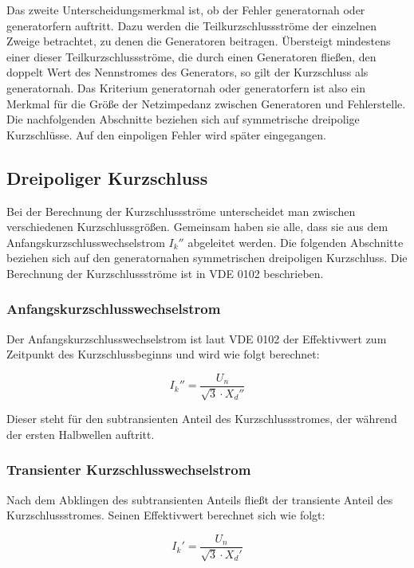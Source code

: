 \documentclass{scrartcl}
\begin{document}
\begin{onehalfspace}
Das zweite Unterscheidungsmerkmal ist, ob der Fehler \glqq generatornah\grqq{} oder \glqq generatorfern\grqq{} auftritt. Dazu werden die Teilkurzschlussströme der einzelnen Zweige betrachtet, zu denen die Generatoren beitragen. Übersteigt mindestens einer dieser Teilkurzschlussströme, die durch einen Generatoren fließen, den doppelt Wert des Nennstromes des Generators, so gilt der Kurzschluss als generatornah. Das Kriterium \glqq generatornah oder generatorfern\grqq{} ist also ein Merkmal für die Größe der Netzimpedanz zwischen Generatoren und Fehlerstelle. \\
Die nachfolgenden Abschnitte beziehen sich auf symmetrische dreipolige Kurzschlüsse. Auf den einpoligen Fehler wird später eingegangen.

\subsection{Dreipoliger Kurzschluss}
Bei der Berechnung der Kurzschlussströme unterscheidet man zwischen verschiedenen Kurzschlussgrößen. Gemeinsam haben sie alle, dass sie aus dem Anfangskurzschlusswechselstrom $I_k''$ abgeleitet werden. Die folgenden Abschnitte beziehen sich auf den generatornahen symmetrischen dreipoligen Kurzschluss. Die Berechnung der Kurzschlussströme ist in VDE 0102 beschrieben.

\subsubsection{Anfangskurzschlusswechselstrom}
Der Anfangskurzschlusswechselstrom ist laut VDE 0102 der \glqq Effektivwert zum Zeitpunkt des Kurzschlussbeginns\grqq{} und wird wie folgt berechnet:

\begin{equation}
I_k'' = \frac{U_n}{\sqrt{3} \cdot X_d''}
\end{equation}

Dieser steht für den subtransienten Anteil des Kurzschlussstromes, der während der ersten Halbwellen auftritt.

\subsubsection{Transienter Kurzschlusswechselstrom}
Nach dem Abklingen des subtransienten Anteils fließt der transiente Anteil des Kurzschlussstromes. Seinen Effektivwert berechnet sich wie folgt:

\begin{equation}
I_k' = \frac{U_n}{\sqrt{3} \cdot X_d'}
\end{equation}


\end{onehalfspace}
\end{document}
